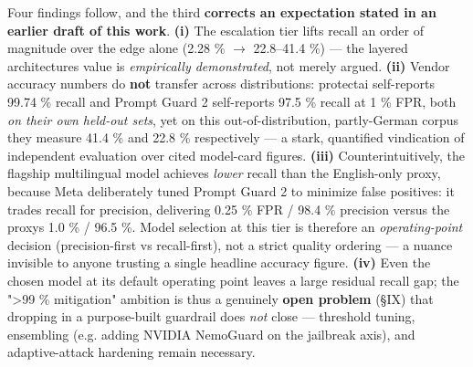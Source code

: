 {\def\LTcaptype{none} %
\begin{table}[!t]\centering\scriptsize
{}
\end{table}
}

Four findings follow, and the third \textbf{corrects an expectation
stated in an earlier draft of this work}. \textbf{(i)} The escalation
tier lifts recall an order of magnitude over the edge alone (2.28 \% $\to$
22.8--41.4 \%) --- the layered architecture\textquotesingle s value is
\emph{empirically demonstrated}, not merely argued. \textbf{(ii)} Vendor
accuracy numbers do \textbf{not} transfer across distributions:
protectai self-reports 99.74 \% recall and Prompt Guard 2 self-reports
97.5 \% recall at 1 \% FPR, both \emph{on their own held-out sets}, yet
on this out-of-distribution, partly-German corpus they measure 41.4 \%
and 22.8 \% respectively --- a stark, quantified vindication of
independent evaluation over cited model-card figures. \textbf{(iii)}
Counterintuitively, the flagship multilingual model achieves
\emph{lower} recall than the English-only proxy, because Meta
deliberately tuned Prompt Guard 2 to minimize false positives: it trades
recall for precision, delivering 0.25 \% FPR / 98.4 \% precision versus
the proxy\textquotesingle s 1.0 \% / 96.5 \%. Model selection at this
tier is therefore an \emph{operating-point} decision (precision-first vs
recall-first), not a strict quality ordering --- a nuance invisible to
anyone trusting a single headline accuracy figure. \textbf{(iv)} Even
the chosen model at its default operating point leaves a large residual
recall gap; the "\textgreater99 \% mitigation" ambition is thus a
genuinely \textbf{open problem} (§IX) that dropping in a purpose-built
guardrail does \emph{not} close --- threshold tuning, ensembling (e.g.
adding NVIDIA NemoGuard on the jailbreak axis), and adaptive-attack
hardening remain necessary.

